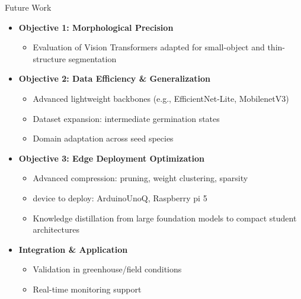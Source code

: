 \documentclass[aspectratio=169]{beamer}
\begin{document}
\begin{frame}{Future Work}
    \begin{itemize}
        \item \textbf{Objective 1: Morphological Precision}
            \begin{itemize}
                \scriptsize
                \item Evaluation of Vision Transformers adapted for small-object and thin-structure segmentation
            \end{itemize}
        
        \item \textbf{Objective 2: Data Efficiency \& Generalization}
            \begin{itemize}
                \scriptsize
                \item Advanced lightweight backbones (e.g., EfficientNet-Lite, MobilenetV3)
                \item Dataset expansion: intermediate germination states
                \item Domain adaptation across seed species
                
            \end{itemize}
        
        \item \textbf{Objective 3: Edge Deployment Optimization}
            \begin{itemize}
                \scriptsize
                \item Advanced compression: pruning, weight clustering, sparsity
                \item device to deploy: ArduinoUnoQ, Raspberry pi 5
                \item Knowledge distillation from large foundation models to compact student architectures
            \end{itemize}
        
        \item \textbf{Integration \& Application}
            \begin{itemize}
                \scriptsize
                \item Validation in greenhouse/field conditions
                \item Real-time monitoring support
            \end{itemize}
    \end{itemize}
\end{frame}
\end{document}
